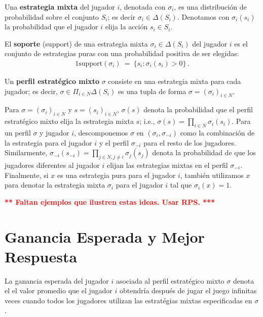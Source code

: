 \begin{definition} Una \textbf{estrategia mixta} del jugador $i$, denotada con $\sigma_i$, es una distribución de probabilidad sobre el conjunto $S_i$; es decir $\sigma_i \in \Delta(S_i)$. Denotamos con $\sigma_i(s_i)$ la probabilidad que el jugador $i$ elija la acción $s_i \in S_i$. 
\end{definition}

\begin{definition}
El \textbf{soporte} (support) de una estrategia mixta $\sigma_i \in \Delta(S_i)$ del jugador $i$ es el conjunto de estrategias puras con una probabilidad positiva de ser elegidas:
\begin{alignat}{1}
\text{support}(\sigma_i)\ =\ \{s_i : \sigma_i(s_i) > 0 \} \,.
\end{alignat}
\end{definition}

\begin{definition}
Un \textbf{perfil estratégico mixto} $\sigma$ consiste en una estrategia mixta para cada jugador; es decir, $\sigma \in \Pi_{i \in N} \Delta(S_i)$ es una tupla de forma $\sigma=(\sigma_i)_{i \in N}$.
\end{definition}

Para $\sigma = (\sigma_i)_{i \in N}$ y $s = (s_i)_{i \in N}$, $\sigma(s)$ denota la probabilidad que el perfil estratégico mixto elija la estrategia mixta $s$; i.e., $\sigma(s)=\prod_{i\in N} \sigma_i(s_i)$. Para un perfil $\sigma$ y jugador $i$, descomponemos $\sigma$ en $(\sigma_i,\sigma_{-i})$ como la combinación de la estrategia para el jugador $i$ y el perfil $\sigma_{-i}$ para el resto de los jugadores. Similarmente, $\sigma_{-i}(s_{-i})=\prod_{j\in N,j\neq i}\sigma_j(s_j)$ denota la probabilidad de que los jugadores diferentes al jugador $i$ elijan las estrategias mixtas en el perfil $\sigma_{-i}$. Finalmente, si $x$ es una estrategia pura para el jugador $i$, también utilizamos $x$ para denotar la estrategia mixta $\sigma_i$ para el jugador $i$ tal que $\sigma_i(x)=1$.

\noindent\textcolor{red}{\bf*** Faltan ejemplos que ilustren estas ideas. Usar RPS. ***}

\section{Ganancia Esperada y Mejor Respuesta}
La ganancia esperada del jugador $i$ asociada al perfil estratégico mixto $\sigma$ denota el el valor promedio que el jugador $i$ obtendría después de jugar el juego infinitas veces cuando todos los jugadores utilizan las estratégias mixtas especificadas en $
\sigma$. 


